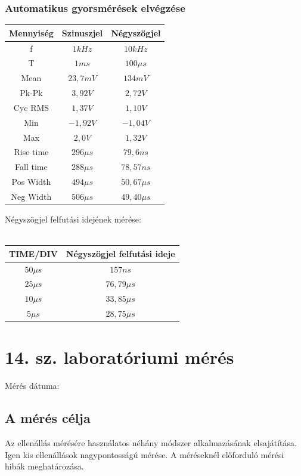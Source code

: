 \documentclass[10pt,a4paper]{article}
\begin{document}
			\subsubsection{Automatikus gyorsmérések elvégzése}
			\begin{tabular}{|c|c|c|}
			\hline 
			Mennyiség & Szinuszjel & Négyszögjel \\ 
			\hline 
			f & $1 kHz$ & $10 kHz$ \\ 
			\hline 
			T & $1 ms$ & $100 \mu s$ \\ 
			\hline 
			Mean & $23,7 mV$ & $134 mV$ \\ 
			\hline 
			Pk-Pk & $3,92 V$ & $2,72 V$ \\ 
			\hline 
			Cyc RMS & $1,37 V$ & $1,10 V$ \\ 
			\hline 
			Min & $-1,92 V$ & $-1,04 V$ \\ 
			\hline 
			Max & $2,0 V$ & $1,32 V$ \\ 
			\hline 
			Rise time & $296 \mu s$ & $79,6 ns$ \\ 
			\hline 
			Fall time & $288 \mu s$ & $78,57 ns$ \\ 
			\hline 
			Pos Width & $494 \mu s$ & $50,67 \mu s$ \\ 
			\hline 
			Neg Width & $506 \mu s$ & $49,40\mu s$ \\ 
			\hline 
			\end{tabular} 
			$$$$
			Négyszögjel felfutási idejének mérése:\\\\
			\begin{tabular}{|c|c|}
			\hline 
			TIME/DIV & Négyszögjel felfutási ideje \\ 
			\hline 
			$50 \mu s$ & $157 ns$ \\ 
			\hline 
			$25 \mu s$ & $76,79 \mu s$ \\ 
			\hline 
			$10 \mu s$ & $33,85 \mu s$ \\ 
			\hline 
			$5\mu s$ & $28,75 \mu s$ \\ 
			\hline 
			\end{tabular} 
\section{14. sz. laboratóriumi mérés}
	Mérés dátuma:\date{2016.10.04}
	\subsection{A mérés célja}
	Az ellenállás mérésére használatos néhány módszer alkalmazásának elsajátítása. Igen kis ellenállások nagypontosságú mérése.
A méréseknél előforduló mérési hibák meghatározása.
\end{document}
